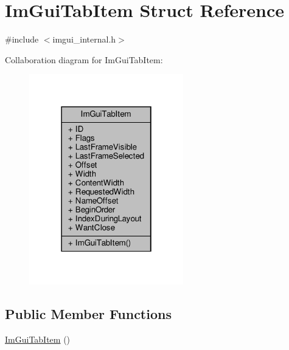 \hypertarget{structImGuiTabItem}{}\section{Im\+Gui\+Tab\+Item Struct Reference}
\label{structImGuiTabItem}


{\ttfamily \#include $<$imgui\+\_\+internal.\+h$>$}



Collaboration diagram for Im\+Gui\+Tab\+Item\+:
\nopagebreak
\begin{figure}[H]
\begin{center}
\leavevmode
\includegraphics[width=190pt]{structImGuiTabItem__coll__graph}
\end{center}
\end{figure}
\subsection*{Public Member Functions}
\begin{DoxyCompactItemize}
\item 
\hyperlink{structImGuiTabItem_a325c1e06aa749d2dece9d0d589f9dfd1}{Im\+Gui\+Tab\+Item} ()
\end{DoxyCompactItemize}
